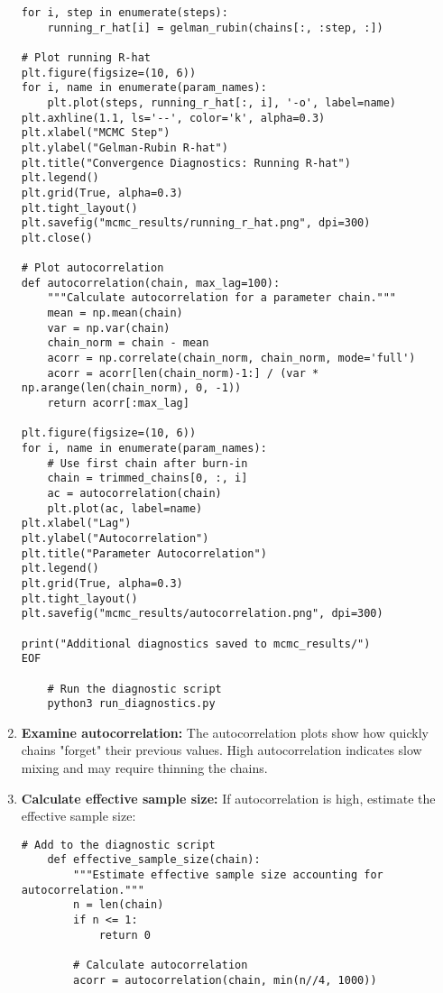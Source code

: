 \documentclass[11pt]{article}
\begin{document}
\begin{enumerate}
\begin{lstlisting}[basicstyle=\small\ttfamily]
for i, step in enumerate(steps):
    running_r_hat[i] = gelman_rubin(chains[:, :step, :])

# Plot running R-hat
plt.figure(figsize=(10, 6))
for i, name in enumerate(param_names):
    plt.plot(steps, running_r_hat[:, i], '-o', label=name)
plt.axhline(1.1, ls='--', color='k', alpha=0.3)
plt.xlabel("MCMC Step")
plt.ylabel("Gelman-Rubin R-hat")
plt.title("Convergence Diagnostics: Running R-hat")
plt.legend()
plt.grid(True, alpha=0.3)
plt.tight_layout()
plt.savefig("mcmc_results/running_r_hat.png", dpi=300)
plt.close()

# Plot autocorrelation
def autocorrelation(chain, max_lag=100):
    """Calculate autocorrelation for a parameter chain."""
    mean = np.mean(chain)
    var = np.var(chain)
    chain_norm = chain - mean
    acorr = np.correlate(chain_norm, chain_norm, mode='full')
    acorr = acorr[len(chain_norm)-1:] / (var * np.arange(len(chain_norm), 0, -1))
    return acorr[:max_lag]

plt.figure(figsize=(10, 6))
for i, name in enumerate(param_names):
    # Use first chain after burn-in
    chain = trimmed_chains[0, :, i]
    ac = autocorrelation(chain)
    plt.plot(ac, label=name)
plt.xlabel("Lag")
plt.ylabel("Autocorrelation")
plt.title("Parameter Autocorrelation")
plt.legend()
plt.grid(True, alpha=0.3)
plt.tight_layout()
plt.savefig("mcmc_results/autocorrelation.png", dpi=300)

print("Additional diagnostics saved to mcmc_results/")
EOF

    # Run the diagnostic script
    python3 run_diagnostics.py
    \end{lstlisting}
    
    \item \textbf{Examine autocorrelation:} The autocorrelation plots show how quickly chains "forget" their previous values. High autocorrelation indicates slow mixing and may require thinning the chains.
    
    \item \textbf{Calculate effective sample size:} If autocorrelation is high, estimate the effective sample size:
    \begin{lstlisting}[basicstyle=\small\ttfamily]
    # Add to the diagnostic script
    def effective_sample_size(chain):
        """Estimate effective sample size accounting for autocorrelation."""
        n = len(chain)
        if n <= 1:
            return 0
            
        # Calculate autocorrelation
        acorr = autocorrelation(chain, min(n//4, 1000))
        

\end{lstlisting}
\end{enumerate}
\end{document}
